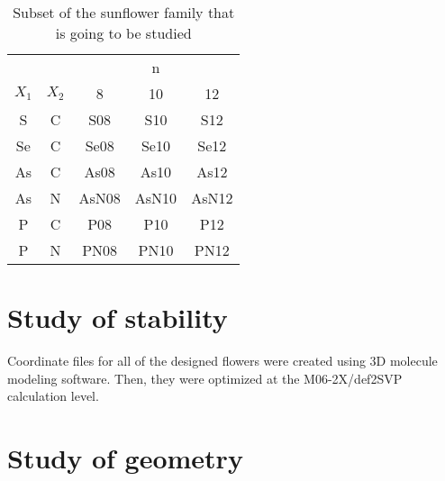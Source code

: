 \begin{table}
    \centering
    \caption[Sunflowers in this study]{Subset of the sunflower family that is going to be studied}
    \begin{tabular}{@{}ccccc@{}}
        \toprule
        && \multicolumn{3}{c}{n} \\
        $X_1$ & $X_2$ & 8 & 10 & 12 \\
        \midrule
        S & C & S08 & S10 & S12 \\
        Se & C & Se08 & Se10 & Se12 \\
        As & C & As08 & As10 & As12 \\
        As & N & AsN08 & AsN10 & AsN12 \\
        P & C & P08 & P10 & P12 \\
        P & N & PN08 & PN10 & PN12 \\
        \bottomrule
    \end{tabular}
\end{table}

\section{Study of stability}

Coordinate files for all of the designed flowers were created using 3D molecule modeling software.
Then, they were optimized at the M06-2X/def2SVP calculation level.


\section{Study of geometry}

\blindtext[5]

